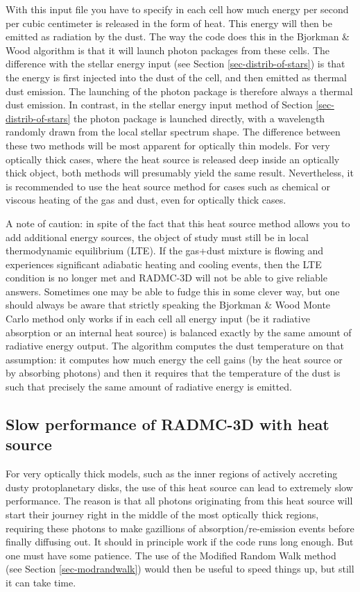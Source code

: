 \documentclass{report}
\begin{document}
With this input file you have to specify in each cell how much energy per
second per cubic centimeter is released in the form of heat. This energy
will then be emitted as radiation by the dust. The way the code does this in
the Bjorkman \& Wood algorithm is that it will launch photon packages from
these cells. The difference with the stellar energy input (see Section
\ref{sec-distrib-of-stars}) is that the energy is first injected into the
dust of the cell, and then emitted as thermal dust emission. The launching
of the photon package is therefore always a thermal dust emission. In
contrast, in the stellar energy input method of Section
\ref{sec-distrib-of-stars} the photon package is launched directly, with a
wavelength randomly drawn from the local stellar spectrum shape. The
difference between these two methods will be most apparent for optically
thin models. For very optically thick cases, where the heat source is
released deep inside an optically thick object, both methods will
presumably yield the same result. Nevertheless, it is recommended to
use the heat source method for cases such as chemical or viscous heating
of the gas and dust, even for optically thick cases. 

A note of caution: in spite of the fact that this heat source method allows
you to add additional energy sources, the object of study must still be in
local thermodynamic equilibrium (LTE). If the gas+dust mixture is flowing
and experiences significant adiabatic heating and cooling events, then the
LTE condition is no longer met and RADMC-3D will not be able to give
reliable answers. Sometimes one may be able to fudge this in some clever
way, but one should always be aware that strictly speaking the Bjorkman \&
Wood Monte Carlo method only works if in each cell all energy input (be it
radiative absorption or an internal heat source) is balanced exactly by the
same amount of radiative energy output. The algorithm  computes
the dust temperature on that assumption: it computes how much energy the
cell gains (by the heat source or by absorbing photons) and then it requires
that the temperature of the dust is such that precisely the same amount of
radiative energy is emitted. 


\subsection{Slow performance of RADMC-3D with heat source}
For very optically thick models, such as the inner regions of actively
accreting dusty protoplanetary disks, the use of this heat source can lead
to extremely slow performance. The reason is that all photons originating
from this heat source will start their journey right in the middle of the
most optically thick regions, requiring these photons to make gazillions of
absorption/re-emission events before finally diffusing out. It should in
principle work if the code runs long enough. But one must have some
patience. The use of the Modified Random Walk method (see Section
\ref{sec-modrandwalk}) would then be useful to speed things up, but still it
can take time.
\end{document}
